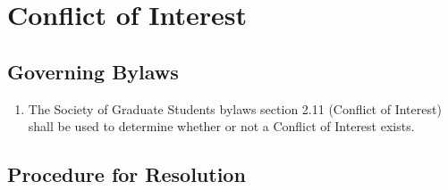 \section{Conflict of Interest}

\subsection{Governing Bylaws}
\begin{enumerate} [align=left]
\item The Society of Graduate Students bylaws section 2.11 (Conflict of Interest) shall be used to
determine whether or not a Conflict of Interest exists.
\end{enumerate}

\subsection{Procedure for Resolution}
